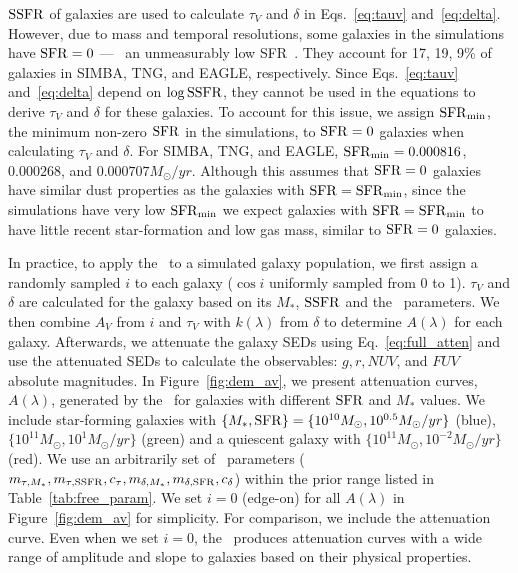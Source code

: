 

${\rm SSFR}$ of galaxies are used to calculate $\tau_V$ and $\delta$ in
Eqs.~\ref{eq:tauv} and~\ref{eq:delta}. However, due to mass and temporal resolutions,
some galaxies in the simulations have ${\rm SFR}=0$ --- \ie~an unmeasurably low
SFR~\citep{hahn2019c}. They account for 17, 19, 9\% of galaxies
in SIMBA, TNG, and EAGLE, respectively. Since Eqs.~\ref{eq:tauv}
and~\ref{eq:delta} depend on $\log{\rm SSFR}$, they cannot be used in the equations
to derive $\tau_V$ and $\delta$ for these galaxies. To account for this issue,
we assign ${\rm SFR}_{\rm min}$, the minimum non-zero ${\rm SFR}$ in the simulations, to
${\rm SFR}=0$ galaxies when calculating $\tau_V$ and $\delta$. For SIMBA, TNG, and
EAGLE, ${\rm SFR}_{\rm min}=0.000816$, $0.000268$, and $0.000707 M_\odot/yr$. Although 
this assumes that ${\rm SFR}=0$ galaxies have similar dust properties as the galaxies 
with ${\rm SFR} = {\rm SFR}_{\rm min}$, since the simulations have very low ${\rm SFR}_{\rm min}$ 
we expect galaxies with ${\rm SFR} = {\rm SFR}_{\rm min}$ to have little recent
star-formation and low gas mass, similar to ${\rm SFR}=0$ galaxies. 


In practice, to apply the \eda~to a simulated galaxy population, we first
assign a randomly sampled $i$ to each galaxy ($\cos i$ uniformly sampled from 0 to 1).
$\tau_V$ and $\delta$ are calculated for
the galaxy based on its $M_*$,
${\rm SSFR}$ and the \eda~parameters. We then combine $A_V$ from $i$ and
$\tau_V$ with $k(\lambda)$ from $\delta$ to determine $A(\lambda)$ for each
galaxy.
Afterwards, we attenuate the galaxy SEDs using Eq.~\ref{eq:full_atten} and use
the attenuated SEDs to calculate the observables: $g, r, NUV$, and $FUV$
absolute magnitudes. 
In Figure~\ref{fig:dem_av}, we present attenuation curves, $A(\lambda)$,
generated by the \eda~for galaxies with different ${\rm SFR}$ and $M_*$ values.  
We include star-forming galaxies with $\{M_*, {\rm SFR}\} = \{10^{10}M_\odot,
10^{0.5}M_\odot/yr\}$ (blue), $\{10^{11}M_\odot, 10^{1} M_\odot/yr\}$
(green) and a quiescent galaxy with $\{10^{11}M_\odot, 10^{-2}M_\odot/yr\}$
(red).
We use an arbitrarily set of \eda~parameters ($m_{\tau,M_*}, m_{\tau,{\rm SSFR}}, c_\tau,
m_{\delta,M_*}, m_{\delta,{\rm SFR}}, c_\delta$) within the prior range listed in
Table~\ref{tab:free_param}. 
We set $i=0$ (edge-on) for all $A(\lambda)$ in Figure~\ref{fig:dem_av} for
simplicity.
For comparison, we include the \cite{calzetti2001} attenuation curve. Even when
we set $i=0$, the \eda~produces attenuation curves with a wide range
of amplitude and slope to galaxies based on their physical properties. 

